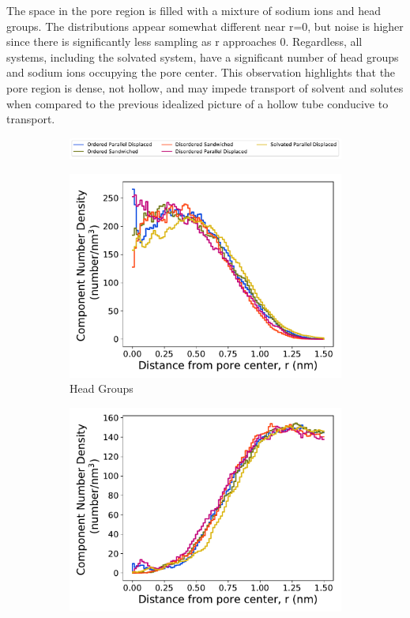 \documentclass[journal=jpcbfk,manuscript=article]{achemso}
\begin{document}
  The space in the pore region is filled with a mixture of sodium ions
  and head groups. The distributions appear somewhat different near r=0, but noise 
  is higher since there is significantly less sampling as r approaches 0. Regardless, 
  all systems, including the solvated system, have a significant number of head groups 
  and sodium ions occupying the pore center. This observation highlights that the pore
  region is dense, not hollow, and may impede transport of solvent and solutes when
  compared to the previous idealized picture of a hollow tube conducive to transport.
  
  \begin{figure}[!htb]
  \centering
  \begin{subfigure}{\textwidth}
  \includegraphics[width=\textwidth]{regional_density_legend.pdf}
  \end{subfigure}
  \begin{subfigure}{0.32\textwidth}
        \includegraphics[width=1\linewidth]{head_group_density.pdf}
        \caption{Head Groups}
        \label{fig:head_groups_regional_density}
  \end{subfigure}
  \begin{subfigure}{0.32\textwidth}
        \includegraphics[width=1\linewidth]{tails_density.pdf}

\end{subfigure}
\end{figure}
\end{document}
